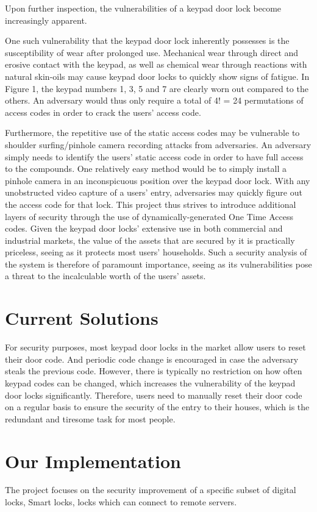\documentclass[conference]{IEEEtran}
\begin{document}
Upon further inspection, the vulnerabilities of a keypad door lock become increasingly apparent.

One such vulnerability that the keypad door lock inherently possesses is  the susceptibility of wear after prolonged use. Mechanical wear through direct and erosive contact with the keypad, as well as chemical wear through reactions with natural skin-oils may cause keypad door locks to quickly show signs of fatigue. In Figure 1, the keypad numbers 1, 3, 5 and 7 are clearly worn out compared to the others. An adversary would thus only require a total of 4! = 24 permutations of access codes in order to crack the users’ access code.

Furthermore, the repetitive use of the static access codes may be vulnerable to shoulder surfing/pinhole camera recording attacks from adversaries. An adversary simply needs to identify the users’ static access code in order to have full access to the compounds. One relatively easy method would be to simply install a pinhole camera in an inconspicuous position over the keypad door lock. With any unobstructed video capture of a users’ entry, adversaries may quickly figure out the access code for that lock.
This project thus strives to introduce additional layers of security through the use of dynamically-generated One Time Access codes. Given the keypad door locks’ extensive use in both commercial and industrial markets, the value of the assets that are secured by it is practically priceless, seeing as it protects most users’ households. Such a security analysis of the system is therefore of paramount importance, seeing as its vulnerabilities pose a threat to the incalculable worth of the users’ assets.

\section{Current Solutions}
For security purposes, most keypad door locks in the market allow users to reset their door code. And periodic code change is encouraged in case the adversary steals the previous code. However, there is typically no restriction on how often keypad codes can be changed, which increases the vulnerability of the keypad door locks significantly.
Therefore, users need to manually reset their door code on a regular basis to ensure the security of the entry to their houses, which is the redundant and tiresome task for most people.

\section{Our Implementation}
The project focuses on the security improvement of a specific subset of digital locks, Smart locks, locks which can connect to remote servers.
\end{document}
